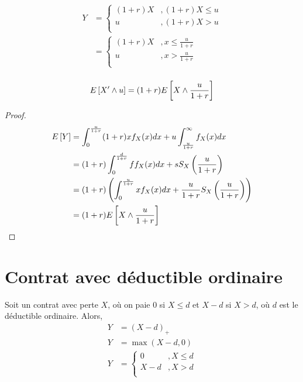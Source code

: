 \documentclass[12pt, french]{report}
\begin{document}
\begin{align*}
Y & = 
\begin{cases}
(1+r) X	&, (1+r)X \leq u \\
u		&, (1+r) X > u \\
\end{cases} \\
	& = 
\begin{cases}
(1+r)X	&, x \leq \frac{u}{1+r} \\
u		&, x > \frac{u}{1+r} \\
\end{cases} \\
\end{align*}
\begin{definition}
\begin{equation}
E \left[ X' \wedge u \right] = (1+r) E \left[ X  \wedge \frac{u}{1+r} \right] 
\end{equation}
\end{definition}

\begin{proof}
\begin{align*}
E \left[ Y \right]	& = \int_{0}^{\frac{u}{1+r}} (1+r) x f_X(x) dx  + u \int_{\frac{u}{1+r}}^{\infty} f_X(x) dx \\
	& = (1+r) \int_{0}^{\frac{d}{1+r}} f f_X(x) dx + s S_X \left( \frac{u}{1+r} \right) \\
	& = (1+r) \left( \int_{0}^{\frac{u}{1+r}} x f_X(x) dx  + \frac{u}{1+r} S_X \left( \frac{u}{1+r} \right)    \right)	 \\
	& = (1+r) E \left[ X  \wedge \frac{u}{1+r} \right]  \\
\end{align*}
\end{proof}





\section{Contrat avec déductible ordinaire}
Soit un contrat avec perte $X$, où on paie 0 si $X \leq d$ et $X-d$ si $X > d$, où $d$ est le déductible ordinaire. Alors,
\begin{align*}
Y	& = (X-d)_+ \\
Y	& = \max(X-d, 0) \\
Y & = \begin{cases}
0	& , X \leq d \\
X - d	&, X > d \\
\end{cases} \\
\end{align*}
\end{document}
